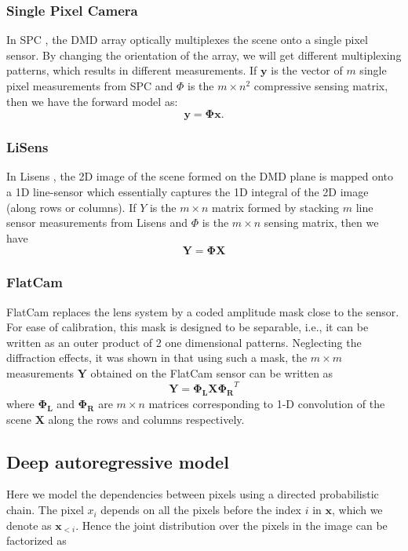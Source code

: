 \documentclass[journal,twoside]{IEEEtran}
\newcommand{\X}{\mathbf{X}}
\newcommand{\Y}{\mathbf{Y}}
\newcommand{\x}{\mathbf{x}}
\newcommand{\y}{\mathbf{y}}
\begin{document}
\subsubsection{Single Pixel Camera}
In SPC \cite{duarte2008single}, the DMD array optically multiplexes the scene onto a single pixel sensor. By changing the orientation of the array, we will get different multiplexing patterns, which results in different measurements. If $\y$ is the vector of $m$ single pixel measurements from SPC and $\Phi$ is the $m \times n^2$ compressive sensing matrix, then we have the forward model as:
\begin{equation}
\y = \bm{\Phi} \x.
\end{equation}

\subsubsection{LiSens}
In Lisens \cite{wang2015lisens}, the 2D image of the scene formed on the DMD plane is mapped onto a 1D line-sensor which essentially captures the 1D integral of the 2D image (along rows or columns). If $Y$ is the $m \times n$ matrix formed by stacking $m$ line sensor measurements from Lisens and $\Phi$ is the $m \times n$ sensing matrix, then we have
\begin{equation}
\Y = \bm{\Phi} \X
\end{equation}

\subsubsection{FlatCam}
FlatCam \cite{asif2017flatcam} replaces the lens system by a coded amplitude mask close to the sensor. For ease of calibration, this mask is designed to be separable, i.e., it can be written as an outer product of 2 one dimensional patterns. Neglecting the diffraction effects, it was shown in \cite{asif2017flatcam} that using such a mask, the $m \times m$ measurements $\Y$ obtained on the FlatCam sensor can be written as 
\begin{equation}
\Y = \bm{\Phi_L} \X \bm{\Phi_R}^T
\end{equation}
where $\bm{\Phi_L}$ and $\bm{\Phi_R}$ are $m \times n$ matrices corresponding to 1-D convolution of the scene $\X$ along the rows and columns respectively. 


\subsection{Deep autoregressive model}
Here we model the dependencies between pixels using a directed probabilistic chain. The pixel $x_i$ depends on all the pixels before the index $i$ in $\x$, which we denote as $\mathbf{x}_{<i}$. Hence the joint distribution over the pixels in the image can be factorized as 
\end{document}
